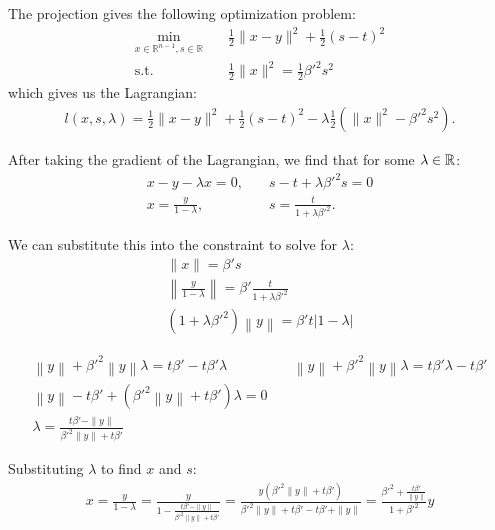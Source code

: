 The projection gives the following optimization problem:
\begin{align*}
\min_{x \in \mathbb R^{n-1}, s \in \mathbb R} & \quad \frac 1 2 \|x - y\|^2 + \frac 1 2 (s - t)^2 \\
	\textrm{s.t.}		& \quad \frac 1 2 \|x\|^2 = \frac 1 2 {\beta'}^2 s^2
\end{align*}
which gives us the Lagrangian:
\begin{align*}
l(x, s, \lambda) = \frac 1 2 \|x - y \|^2 + \frac 1 2 \left(s - t\right)^2 - \lambda \frac 1 2 \left(\|x\|^2 - {\beta'}^2 s^2\right).
\end{align*}

After taking the gradient of the Lagrangian, we find that for some $\lambda \in \mathbb R$:
\begin{align*}
x - y - \lambda x = 0, & \quad s - t + \lambda {\beta'}^2 s = 0 \\
x = \frac {y}{1 - \lambda}, & \quad s = \frac {t}{1 + \lambda {\beta'}^2 }.
\end{align*}

We can substitute this into the constraint to solve for $\lambda$:
\begin{align*}
\|x\| = {\beta'} s \\
\left\|\frac {y}{1 - \lambda}\right\| = {\beta'} \frac {t}{1 + \lambda {\beta'}^2 } \\
\left(1 + \lambda {\beta'}^2\right) \left\|y\right\| = {\beta'}  {t} \left|1 - \lambda\right|
\end{align*}

\begin{align*}
\left\|y\right\| + {\beta'}^2\left\|y\right\|\lambda = t {\beta'} - t {\beta'} \lambda          &   \quad
\left\|y\right\| + {\beta'}^2\left\|y\right\|\lambda = t {\beta'} \lambda - t {\beta'}					\\
\left\|y\right\|-t {\beta'} +\left( {\beta'}^2\left\|y\right\| + t {\beta'} \right)\lambda = 0  &		\\
\lambda = \frac{t {\beta'} - \|y\|}{{\beta'}^2\|y\| + t {\beta'}}                               &		
\end{align*}


Substituting $\lambda$ to find $x$ and $s$:
\begin{align*}
x = \frac {y}{1 - \lambda} 																		
= \frac {y}{1 - \frac{t{\beta'} - \|y\|}{{\beta'}^2\|y\| + t{\beta'}}} 									
= \frac {y\left({\beta'}^2\|y\| + t{\beta'}\right)}{{\beta'}^2\|y\| + t{\beta'} - t{\beta'} + \|y\|} 			
= \frac {{\beta'}^2 + \frac{t{\beta'}}{\|y\|}}{1 + {\beta'}^2}y 											
\end{align*}


